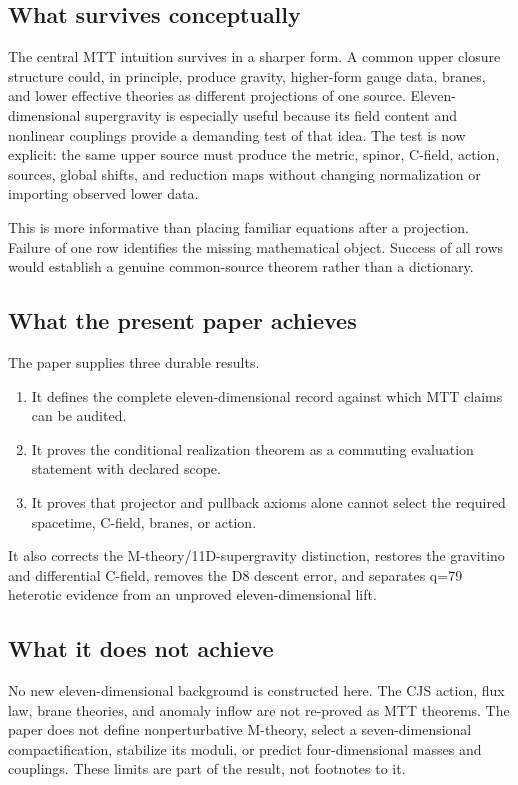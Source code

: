 \documentclass[11pt]{article}
\theoremstyle{definition}
\theoremstyle{remark}
\begin{document}
\subsection{What survives conceptually}

The central MTT intuition survives in a sharper form.  A common upper
closure structure could, in principle, produce gravity, higher-form gauge
data, branes, and lower effective theories as different projections of one
source.  Eleven-dimensional supergravity is especially useful because its
field content and nonlinear couplings provide a demanding test of that
idea.  The test is now explicit: the same upper source must produce the
metric, spinor, C-field, action, sources, global shifts, and reduction maps
without changing normalization or importing observed lower data.

This is more informative than placing familiar equations after a projection.
Failure of one row identifies the missing mathematical object.  Success of
all rows would establish a genuine common-source theorem rather than a
dictionary.

\subsection{What the present paper achieves}

The paper supplies three durable results.
\begin{enumerate}[leftmargin=1.7em]
\item It defines the complete eleven-dimensional record against which MTT
      claims can be audited.
\item It proves the conditional realization theorem as a commuting
      evaluation statement with declared scope.
\item It proves that projector and pullback axioms alone cannot select the
      required spacetime, C-field, branes, or action.
\end{enumerate}
It also corrects the M-theory/11D-supergravity distinction, restores the
gravitino and differential C-field, removes the D8 descent error, and
separates q=79 heterotic evidence from an unproved eleven-dimensional lift.

\subsection{What it does not achieve}

No new eleven-dimensional background is constructed here.  The CJS action,
flux law, brane theories, and anomaly inflow are not re-proved as MTT
theorems.  The paper does not define nonperturbative M-theory, select a
seven-dimensional compactification, stabilize its moduli, or predict
four-dimensional masses and couplings.  These limits are part of the result,
not footnotes to it.
\end{document}
